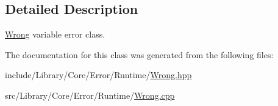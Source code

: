 \subsection{Detailed Description}
\hyperlink{classlibrary_1_1core_1_1error_1_1runtime_1_1_wrong}{Wrong} variable error class. 

The documentation for this class was generated from the following files\+:\begin{DoxyCompactItemize}
\item 
include/\+Library/\+Core/\+Error/\+Runtime/\hyperlink{_wrong_8hpp}{Wrong.\+hpp}\item 
src/\+Library/\+Core/\+Error/\+Runtime/\hyperlink{_wrong_8cpp}{Wrong.\+cpp}\end{DoxyCompactItemize}
